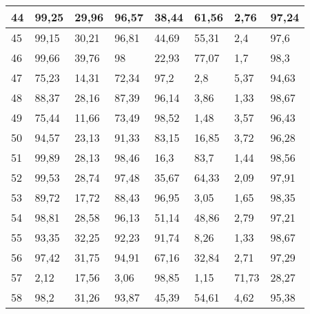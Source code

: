 \begin{longtable}[c]{|l|l|l|l|l|l|l|l|}
44              & 99,25        & 29,96        & 96,57       & 38,44         & 61,56         & 2,76          & 97,24         \\ \hline
45              & 99,15        & 30,21        & 96,81       & 44,69         & 55,31         & 2,4           & 97,6          \\ \hline
46              & 99,66        & 39,76        & 98          & 22,93         & 77,07         & 1,7           & 98,3          \\ \hline
47              & 75,23        & 14,31        & 72,34       & 97,2          & 2,8           & 5,37          & 94,63         \\ \hline
48              & 88,37        & 28,16        & 87,39       & 96,14         & 3,86          & 1,33          & 98,67         \\ \hline
49              & 75,44        & 11,66        & 73,49       & 98,52         & 1,48          & 3,57          & 96,43         \\ \hline
50              & 94,57        & 23,13        & 91,33       & 83,15         & 16,85         & 3,72          & 96,28         \\ \hline
51              & 99,89        & 28,13        & 98,46       & 16,3          & 83,7          & 1,44          & 98,56         \\ \hline
52              & 99,53        & 28,74        & 97,48       & 35,67         & 64,33         & 2,09          & 97,91         \\ \hline
53              & 89,72        & 17,72        & 88,43       & 96,95         & 3,05          & 1,65          & 98,35         \\ \hline
54              & 98,81        & 28,58        & 96,13       & 51,14         & 48,86         & 2,79          & 97,21         \\ \hline
55              & 93,35        & 32,25        & 92,23       & 91,74         & 8,26          & 1,33          & 98,67         \\ \hline
56              & 97,42        & 31,75        & 94,91       & 67,16         & 32,84         & 2,71          & 97,29         \\ \hline
57              & 2,12         & 17,56        & 3,06        & 98,85         & 1,15          & 71,73         & 28,27         \\ \hline
58              & 98,2         & 31,26        & 93,87       & 45,39         & 54,61         & 4,62          & 95,38         \\ \hline

\end{longtable}
